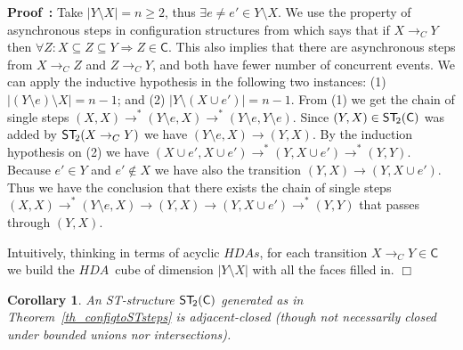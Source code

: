 \documentclass[submission,copyright,creativecommons]{eptcs}
\newtheorem{corollary}[theorem]{Corollary}
\newenvironment{proof}[1][\!\!\,]{\vspace{1ex}\noindent\textbf{Proof #1: }}{\hfill$\Box$\vspace{2ex}}
\newcommand\HDA{\ensuremath{\mathit{HDA}}}
\newcommand\HDAs{\ensuremath{\mathit{HDAs}}}
\newcommand\C{\ensuremath{\mathsf{C}}}
\newcommand\stepTransConfGlabbeek{\ensuremath{\rightarrow_{C}}}
\newcommand\cintostSecond{\ensuremath{\mathsf{ST}_{\hspace{-0.4ex}2}}}
\newcommand\STofC[1]{\ensuremath{\cintostSecond(#1)}}
\newcommand{\transition}[1]{\ensuremath{\xrightarrow{#1}}}
\begin{document}
\begin{proof}
Take $|Y\setminus X|=n\geq 2$, thus $\exists e\neq e'\in Y\setminus X$. 
We use the property of asynchronous steps in configuration structures from \cite[Def.2.1]{GlabbeekP09configStruct} which says that if $X\stepTransConfGlabbeek Y$ then $\forall Z:X\subseteq Z\subseteq Y \Rightarrow Z\in\C$. This also implies that there are asynchronous steps from $X\stepTransConfGlabbeek Z$ and $Z\stepTransConfGlabbeek Y$, and both have fewer number of concurrent events. 
We can apply the inductive hypothesis in the following two instances:
(1) $|(Y\setminus e)\setminus X|=n-1$; and (2) $|Y\setminus(X\cup e')|=n-1$. From (1) we get the chain of single steps $(X,X)\transition{}^{*}(Y\setminus e,X)\transition{}^{*}(Y\setminus e,Y\setminus e)$. Since $(Y,X)\in\STofC{\C}$ was added by $\cintostSecond(X\stepTransConfGlabbeek Y)$ we have $(Y\setminus e,X)\transition{}(Y,X)$. By the induction hypothesis on (2) we have $(X\cup e',X\cup e')\transition{}^{*}(Y,X\cup e')\transition{}^{*}(Y,Y)$. 
Because $e'\in Y$ and $e'\not\in X$ we have also the transition $(Y,X)\transition{}(Y,X\cup e')$.
Thus we have the conclusion that there exists the chain of single steps $(X,X)\transition{}^{*}(Y\setminus e,X)\transition{}(Y,X)\transition{}(Y,X\cup e')\transition{}^{*}(Y,Y)$ that passes through $(Y,X)$.

Intuitively, thinking in terms of acyclic \HDAs, for each transition $X\stepTransConfGlabbeek Y\in \C$ we build the \HDA\ cube of dimension $|Y\setminus X|$ with all the faces filled in.
\end{proof}


\begin{corollary}\label{cor_adjacent}
An ST-structure $\STofC{\C}$ generated as in Theorem~\ref{th_configtoSTsteps} is adja\-cent-closed (though not necessarily closed under bounded unions nor intersections).
\end{corollary}
\end{document}
